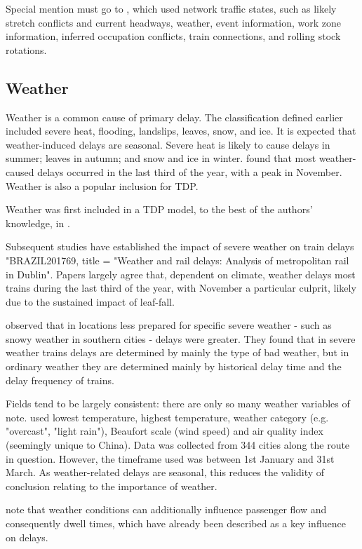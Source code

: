 \documentclass{article}
\begin{document}
Special mention must go to \cite{nair_et_al_2019}, which used network traffic states, such as likely stretch conflicts and current headways, weather, event information, work zone information, inferred occupation conflicts, train connections, and rolling stock rotations.

\subsection{Weather}

Weather is a common cause of primary delay. The classification defined earlier included severe heat, flooding, landslips, leaves, snow, and ice. It is expected that weather-induced delays are seasonal. Severe heat is likely to cause delays in summer; leaves in autumn; and snow and ice in winter. \cite{brazil_2017} found that most weather-caused delays occurred in the last third of the year, with a peak in November. Weather is also a popular inclusion for TDP. 

Weather was first included in a TDP model, to the best of the authors' knowledge, in \cite{oneto_et_al_2016}.

Subsequent studies have established the impact of severe weather on train delays "BRAZIL201769, title = "Weather and rail delays: Analysis of metropolitan rail in Dublin".
Papers largely agree that, dependent on climate, weather delays most trains during the last third of the year, with November a particular culprit, likely due to the sustained impact of leaf-fall.

\cite{wang_et_al_2019} observed that in locations less prepared for specific severe weather - such as snowy weather in southern cities - delays were greater. They found that in severe weather trains delays are determined by mainly the type of bad weather, but in ordinary weather they are determined mainly by historical delay time and the delay frequency of trains. 

Fields tend to be largely consistent: there are only so many weather variables of note. \cite{wang_et_al_2019} used lowest temperature, highest temperature, weather category (e.g. "overcast", "light rain"), Beaufort scale (wind speed) and air quality index (seemingly unique to China). Data was collected from 344 cities along the route in question. However, the timeframe used was between 1st January and 31st March. As weather-related delays are seasonal, this reduces the validity of conclusion relating to the importance of weather. 

\cite{oneto_et_al_2016} note that weather conditions can additionally influence passenger flow and consequently dwell times, which have already been described as a key influence on delays. 
\end{document}
